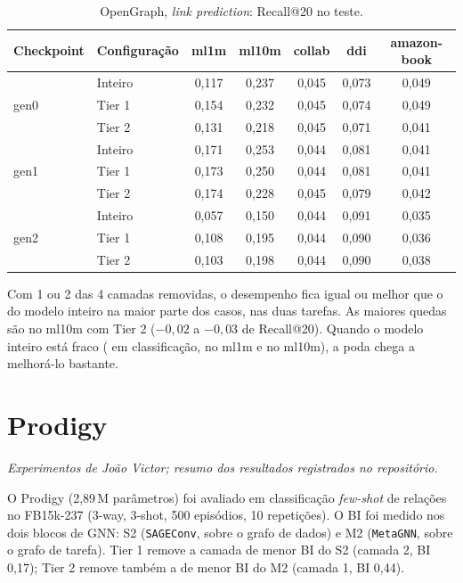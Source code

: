 \documentclass[12pt,a4paper]{article}
\begin{document}
\begin{table}[H]
\centering
\caption{OpenGraph, \emph{link prediction}: Recall@20 no teste.}
\label{tab:og-link}
\begin{tabular}{@{}llccccc@{}}
\toprule
Checkpoint & Configuração & ml1m & ml10m & collab & ddi & amazon-book \\
\midrule
\multirow{3}{*}{gen0} & Inteiro & 0,117 & 0,237 & 0,045 & 0,073 & 0,049 \\
 & Tier 1 & 0,154 & 0,232 & 0,045 & 0,074 & 0,049 \\
 & Tier 2 & 0,131 & 0,218 & 0,045 & 0,071 & 0,041 \\
\midrule
\multirow{3}{*}{gen1} & Inteiro & 0,171 & 0,253 & 0,044 & 0,081 & 0,041 \\
 & Tier 1 & 0,173 & 0,250 & 0,044 & 0,081 & 0,041 \\
 & Tier 2 & 0,174 & 0,228 & 0,045 & 0,079 & 0,042 \\
\midrule
\multirow{3}{*}{gen2} & Inteiro & 0,057 & 0,150 & 0,044 & 0,091 & 0,035 \\
 & Tier 1 & 0,108 & 0,195 & 0,044 & 0,090 & 0,036 \\
 & Tier 2 & 0,103 & 0,198 & 0,044 & 0,090 & 0,038 \\
\bottomrule
\end{tabular}
\end{table}

Com 1 ou 2 das 4 camadas removidas, o desempenho fica igual ou melhor que o do modelo inteiro na maior parte dos casos, nas duas tarefas. As maiores quedas são no ml10m com Tier 2 ($-0{,}02$ a $-0{,}03$ de Recall@20). Quando o modelo inteiro está fraco ( em classificação,  no ml1m e no ml10m), a poda chega a melhorá-lo bastante.

\section{Prodigy}

\emph{Experimentos de João Victor; resumo dos resultados registrados no repositório.}

O Prodigy (2,89\,M parâmetros) foi avaliado em classificação \emph{few-shot} de relações no FB15k-237 (3-way, 3-shot, 500 episódios, 10 repetições). O BI foi medido nos dois blocos de GNN: S2 (\texttt{SAGEConv}, sobre o grafo de dados) e M2 (\texttt{MetaGNN}, sobre o grafo de tarefa). Tier 1 remove a camada de menor BI do S2 (camada 2, BI 0,17); Tier 2 remove também a de menor BI do M2 (camada 1, BI 0,44).
\end{document}
